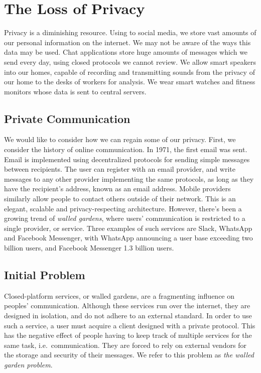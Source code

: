 \chapter{The Loss of Privacy}
Privacy is a diminishing resource.
Using to social media, we store vast amounts of our personal information on the internet.
We may not be aware of the ways this data may be used.
Chat applications store huge amounts of messages which we send every day, using closed protocols we cannot review.
We allow smart speakers into our homes, capable of recording and transmitting sounds from the privacy of our home to the desks of workers for analysis\cite{mozilla_privacy_not_included}.
We wear smart watches and fitness monitors whose data is sent to central servers.

\section{Private Communication}
We would like to consider how we can regain some of our privacy.
First, we consider the history of online communication.
In 1971, the first email was sent\cite{tomlinson2009first}.
Email is implemented using decentralized protocols for sending simple messages between recipients\cite{RFC5321}.
The user can register with an email provider, and write messages to any other provider implementing the same protocols, as long as they have the recipient's address, known as an email address.
Mobile providers similarly allow people to contact others outside of their network.
This is an elegant, scalable and privacy-respecting architecture.
However, there's been a growing trend of \textit{walled gardens}\cite{walled_gardens_gunnar_wolf_acm_2018}, where users' communication is restricted to a single provider, or service.
Three examples of such services are Slack, WhatsApp and Facebook Messenger, with WhatsApp announcing a user base exceeding two billion users, and Facebook Messenger 1.3 billion users\cite{walled_gardens_gunnar_wolf_acm_2018,whatsapp_2b_users_archive_org,messenger_1pt3b_users}.

\section{Initial Problem}\label{subsec:initial_problem_statement}
Closed-platform services, or walled gardens, are a fragmenting influence on peoples' communication.
Although these services run over the internet, they are designed in isolation, and do not adhere to an external standard.
In order to use such a service, a user must acquire a client designed with a private protocol.
This has the negative effect of people having to keep track of multiple services for the same task, i.e.~communication.
They are forced to rely on external vendors for the storage and security of their messages.
We refer to this problem as \textit{the walled garden problem}.

